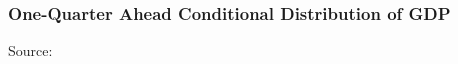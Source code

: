 \documentclass{beamer}
\begin{document}
  

\begin{frame}
  \frametitle{One-Quarter Ahead Conditional Distribution of GDP}
  \hspace*{15pt}\hbox{\scriptsize Source:}
\end{frame}
\end{document}
